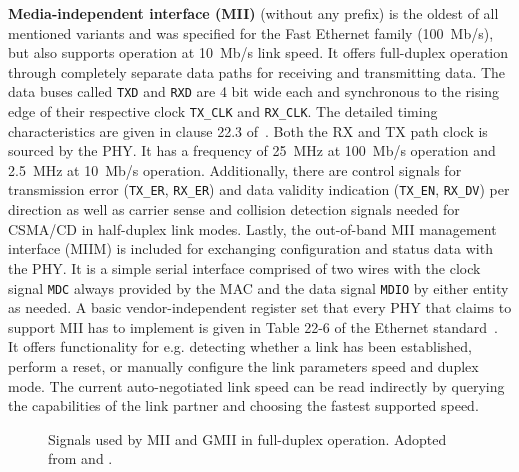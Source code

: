 \documentclass[a4paper, 11pt, oneside]{Thesis}  %
\begin{document}
\textbf{Media-independent interface (MII)} (without any prefix) is the oldest of all mentioned variants and was specified for the Fast Ethernet family (100~Mb/s), but also supports operation at 10~Mb/s link speed. It offers full-duplex operation through completely separate data paths for receiving and transmitting data. The data buses called \texttt{TXD} and \texttt{RXD} are 4 bit wide each and synchronous to the rising edge of their respective clock \texttt{TX\_CLK} and \texttt{RX\_CLK}. The detailed timing characteristics are given in clause 22.3 of~\cite{Ethernet}. Both the RX and TX path clock is sourced by the PHY. It has a frequency of 25~MHz at 100~Mb/s operation and 2.5~MHz at 10~Mb/s operation. Additionally, there are control signals for transmission error (\texttt{TX\_ER}, \texttt{RX\_ER}) and data validity indication (\texttt{TX\_EN}, \texttt{RX\_DV}) per direction as well as carrier sense and collision detection signals needed for CSMA/CD in half-duplex link modes. Lastly, the out-of-band MII management interface (MIIM) is included for exchanging configuration and status data with the PHY. It is a simple serial interface comprised of two wires with the clock signal \texttt{MDC} always provided by the MAC and the data signal \texttt{MDIO} by either entity as needed. A basic vendor-independent register set that every PHY that claims to support MII has to implement is given in Table 22-6 of the Ethernet standard~\cite{Ethernet}. It offers functionality for e.g. detecting whether a link has been established, perform a reset, or manually configure the link parameters speed and duplex mode. The current auto-negotiated link speed can be read indirectly by querying the capabilities of the link partner and choosing the fastest supported speed.

\begin{figure}
\centering

\caption[Signals used by MII and GMII in full-duplex operation]{Signals used by MII and GMII in full-duplex operation. Adopted from \cite[fig. 22-3]{Ethernet} and \cite[fig. 35-2]{Ethernet}.}
\label{fig:miisignals}
\end{figure}
\end{document}
